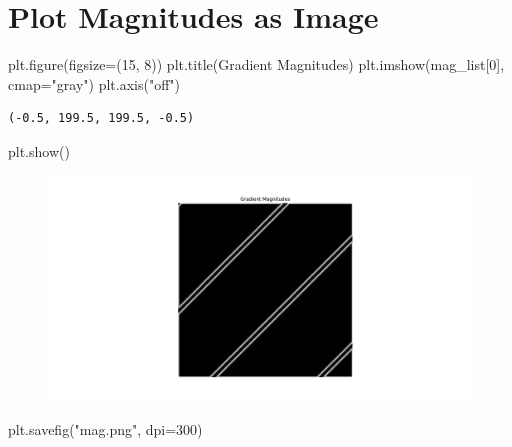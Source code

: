 \documentclass[
  letterpaper,
]{report}
\newenvironment{Shaded}{\begin{snugshade}}{\end{snugshade}}
\newcommand{\DecValTok}[1]{\textcolor[rgb]{0.68,0.00,0.00}{#1}}
\newcommand{\NormalTok}[1]{\textcolor[rgb]{0.00,0.23,0.31}{#1}}
\newcommand{\OperatorTok}[1]{\textcolor[rgb]{0.37,0.37,0.37}{#1}}
\newcommand{\StringTok}[1]{\textcolor[rgb]{0.13,0.47,0.30}{#1}}
\begin{document}
\hypertarget{plot-magnitudes-as-image}{%
\section{Plot Magnitudes as Image}\label{plot-magnitudes-as-image}}

\begin{Shaded}
\begin{Highlighting}[]
\NormalTok{plt.figure(figsize}\OperatorTok{=}\NormalTok{(}\DecValTok{15}\NormalTok{, }\DecValTok{8}\NormalTok{))}
\NormalTok{plt.title(}\StringTok{\textquotesingle{}Gradient Magnitudes\textquotesingle{}}\NormalTok{)}
\NormalTok{plt.imshow(mag\_list[}\DecValTok{0}\NormalTok{], cmap}\OperatorTok{=}\StringTok{"gray"}\NormalTok{)}
\NormalTok{plt.axis(}\StringTok{"off"}\NormalTok{)}
\end{Highlighting}
\end{Shaded}

\begin{verbatim}
(-0.5, 199.5, 199.5, -0.5)
\end{verbatim}

\begin{Shaded}
\begin{Highlighting}[]
\NormalTok{plt.show()}
\end{Highlighting}
\end{Shaded}

\begin{figure}[H]

{\centering \includegraphics{results_files/figure-pdf/unnamed-chunk-8-1.pdf}

}

\end{figure}

\begin{Shaded}
\begin{Highlighting}[]

\NormalTok{plt.savefig(}\StringTok{"mag.png"}\NormalTok{, dpi}\OperatorTok{=}\DecValTok{300}\NormalTok{)}
\end{Highlighting}
\end{Shaded}
\end{document}
